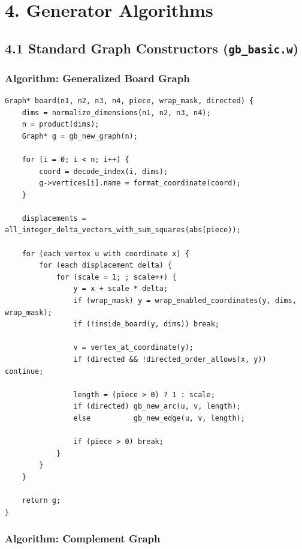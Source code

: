 \documentclass[11pt]{article}
\begin{document}
\section{4. Generator Algorithms}\label{generator-algorithms}

\subsection{\texorpdfstring{4.1 Standard Graph Constructors (\texttt{gb\_basic.w})}{4.1 Standard Graph Constructors (gb\_basic.w)}}\label{standard-graph-constructors-gb_basic.w}

\subsubsection{Algorithm: Generalized Board Graph}\label{algorithm-generalized-board-graph}

\begin{verbatim}
Graph* board(n1, n2, n3, n4, piece, wrap_mask, directed) {
    dims = normalize_dimensions(n1, n2, n3, n4);
    n = product(dims);
    Graph* g = gb_new_graph(n);

    for (i = 0; i < n; i++) {
        coord = decode_index(i, dims);
        g->vertices[i].name = format_coordinate(coord);
    }

    displacements = all_integer_delta_vectors_with_sum_squares(abs(piece));

    for (each vertex u with coordinate x) {
        for (each displacement delta) {
            for (scale = 1; ; scale++) {
                y = x + scale * delta;
                if (wrap_mask) y = wrap_enabled_coordinates(y, dims, wrap_mask);
                if (!inside_board(y, dims)) break;

                v = vertex_at_coordinate(y);
                if (directed && !directed_order_allows(x, y)) continue;

                length = (piece > 0) ? 1 : scale;
                if (directed) gb_new_arc(u, v, length);
                else          gb_new_edge(u, v, length);

                if (piece > 0) break;
            }
        }
    }

    return g;
}
\end{verbatim}

\subsubsection{Algorithm: Complement Graph}\label{algorithm-complement-graph}
\end{document}
